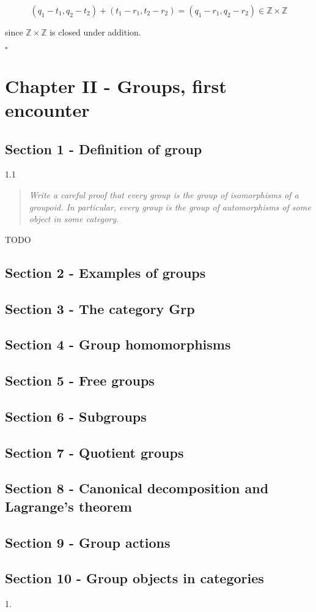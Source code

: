 \documentclass[letterpaper,12pt]{article}
\theoremstyle{definition}
\begin{document}
$$(q_1 - t_1, q_2 - t_2) + (t_1 - r_1, t_2 - r_2) = (q_1 - r_1, q_2 - r_2) \in \mathbb{Z} \times \mathbb{Z}$$

since $\mathbb{Z} \times \mathbb{Z}$ is closed under addition. 

\begin{flushright}
	$\square$
\end{flushright}




\pagebreak

\section*{Chapter II - Groups, first encounter}

\subsection*{Section 1 - Definition of group}

\begin{flushleft}
	1.1
\end{flushleft}

\begin{quote}
	\textit{Write a careful proof that every group is the group of isomorphisms of a groupoid. In particular, every group is the group of automorphisms of some object in some category.}
\end{quote}

TODO


\subsection*{Section 2 - Examples of groups}



\subsection*{Section 3 - The category \textbf{Grp}}
\subsection*{Section 4 - Group homomorphisms}
\subsection*{Section 5 - Free groups}
\subsection*{Section 6 - Subgroups}
\subsection*{Section 7 - Quotient groups}
\subsection*{Section 8 - Canonical decomposition and Lagrange's theorem}
\subsection*{Section 9 - Group actions}
\subsection*{Section 10 - Group objects in categories}


\begin{flushleft}
	1.
\end{flushleft}
\end{document}
